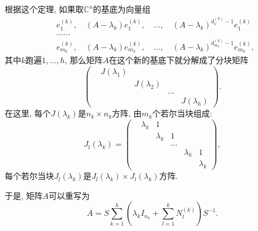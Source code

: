 根据这个定理, 如果取$\mathbb{C}^n$的基底为向量组
$$
\begin{aligned}
&e^{(k)}_1,\quad(A-\lambda_k)e^{(k)}_1,\quad...,\quad(A-\lambda_k)^{d^{(k)}_1-1}e^{(k)}_1\\
&......\\
&e^{(k)}_{m_k},\quad(A-\lambda_k)e^{(k)}_{m_k},\quad...,\quad(A-\lambda_k)^{d^{(k)}_{m_k}-1}e^{(k)}_{m_k},
\end{aligned}
$$
其中$k$跑遍$1,...,h$, 那么矩阵$A$在这个新的基底下就分解成了分块矩阵
$$
\left(
\begin{matrix}
&J(\lambda_1) &  & & \\
& &J(\lambda_2) & & \\
& & &...\\
& & & & J(\lambda_h)
\end{matrix}
\right).
$$
在这里, 每个$J(\lambda_k)$是$n_k\times n_k$方阵, 由$m_k$个若尔当块组成:
$$
J_l(\lambda_k)
=\left(
\begin{matrix}
&\lambda_k & 1 & & & \\
& &\lambda_k & 1 & & \\
& & &...\\
& & & & \lambda_k & 1\\
& & & & & \lambda_k
\end{matrix}
\right),
$$
每个若尔当块$J_l(\lambda_k)$是$J_l(\lambda_k)\times J_l(\lambda_k)$方阵.

于是, 矩阵$A$可以重写为
$$
A=S\sum_{k=1}^h\left(\lambda_kI_{n_k}+\sum_{l=1}^k N_l^{(k)}\right)S^{-1}.
$$
